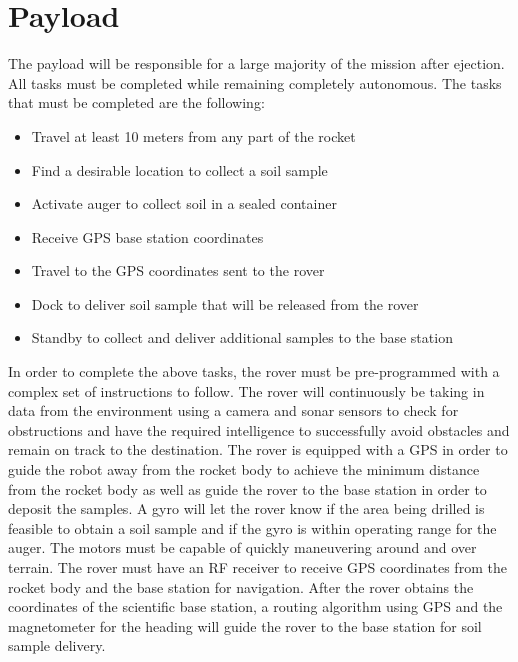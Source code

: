 \documentclass[journal,10pt,draftclsnofoot,onecolumn,compsoc]{IEEEtran} \usepackage[margin=0.75in]{geometry}
\begin{document}
\newpage
\clearpage

\section{Payload}
The payload will be responsible for a large majority of the mission after ejection. All tasks must be completed while remaining completely autonomous. The tasks that must be completed are the following:

\begin{itemize}
    \item Travel at least 10 meters from any part of the rocket
    \item Find a desirable location to collect a soil sample
    \item Activate auger to collect soil in a sealed container
    \item Receive GPS base station coordinates
    \item Travel to the GPS coordinates sent to the rover
    \item Dock to deliver soil sample that will be released from the rover
    \item Standby to collect and deliver additional samples to the base station
\end{itemize}

\setlength{\parindent}{0cm}
In order to complete the above tasks, the rover must be pre-programmed with a complex set of instructions to follow. The rover will continuously be taking in data from the environment using a camera and sonar sensors to check for obstructions and have the required intelligence to successfully avoid obstacles and remain on track to the destination. The rover is equipped with a GPS in order to guide the robot away from the rocket body to achieve the minimum distance from the rocket body as well as guide the rover to the base station in order to deposit the samples. A gyro will let the rover know if the area being drilled is feasible to obtain a soil sample and if the gyro is within operating range for the auger. The motors must be capable of quickly maneuvering around and over terrain. The rover must have an RF receiver to receive GPS coordinates from the rocket body and the base station for navigation. After the rover obtains the coordinates of the scientific base station, a routing algorithm using GPS and the magnetometer for the heading will guide the rover to the base station for soil sample delivery. 
\end{document}

